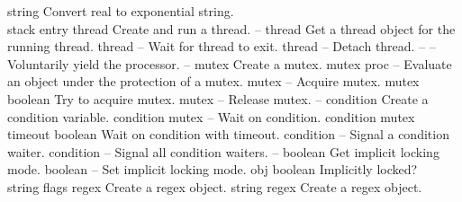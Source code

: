 \begin{longtable}{}
	{string}
	{Convert real to exponential string.}
\hline \hline
{} \\
\hline \hline
\optableent
	{stack entry}
	{{\bf {}}}
	{thread}
	{Create and run a thread.}
\hline
\optableent
	{--}
	{{\bf {}}}
	{thread}
	{Get a thread object for the running thread.}
\hline
\optableent
	{thread}
	{{\bf {}}}
	{--}
	{Wait for thread to exit.}
\hline
\optableent
	{thread}
	{{\bf {}}}
	{--}
	{Detach thread.}
\hline
\optableent
	{--}
	{{\bf {}}}
	{--}
	{Voluntarily yield the processor.}
\hline
\optableent
	{--}
	{{\bf {}}}
	{mutex}
	{Create a mutex.}
\hline
\optableent
	{mutex proc}
	{{\bf {}}}
	{--}
	{Evaluate an object under the protection of a mutex.}
\hline
\optableent
	{mutex}
	{{\bf {}}}
	{--}
	{Acquire mutex.}
\hline
\optableent
	{mutex}
	{{\bf {}}}
	{boolean}
	{Try to acquire mutex.}
\hline
\optableent
	{mutex}
	{{\bf {}}}
	{--}
	{Release mutex.}
\hline
\optableent
	{--}
	{{\bf {}}}
	{condition}
	{Create a condition variable.}
\hline
\optableent
	{condition mutex}
	{{\bf {}}}
	{--}
	{Wait on condition.}
\hline
\optableent
	{condition mutex timeout}
	{{\bf {}}}
	{boolean}
	{Wait on condition with timeout.}
\hline
\optableent
	{condition}
	{{\bf {}}}
	{--}
	{Signal a condition waiter.}
\hline
\optableent
	{condition}
	{{\bf {}}}
	{--}
	{Signal all condition waiters.}
\hline
\optableent
	{--}
	{{\bf {}}}
	{boolean}
	{Get implicit locking mode.}
\hline
\optableent
	{boolean}
	{{\bf {}}}
	{--}
	{Set implicit locking mode.}
\hline
\optableent
	{obj}
	{{\bf {}}}
	{boolean}
	{Implicitly locked?}
\hline \hline
{} \\
\hline \hline
\optableent
	{string flags}
	{{\bf {}}}
	{regex}
	{Create a regex object.}
\optableent
	{string}
	{{\bf {}}}
	{regex}
	{Create a regex object.}

\end{longtable}
